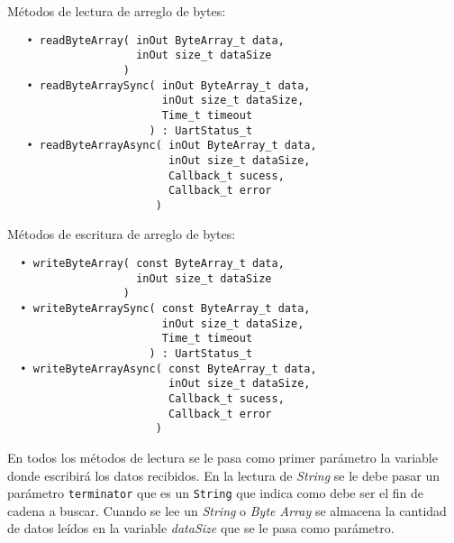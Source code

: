 \pagebreak  
Métodos de lectura de arreglo de bytes:

\begin{verbatim}
   • readByteArray( inOut ByteArray_t data,
                    inOut size_t dataSize
                  )
   • readByteArraySync( inOut ByteArray_t data,
                        inOut size_t dataSize,
                        Time_t timeout
                      ) : UartStatus_t
   • readByteArrayAsync( inOut ByteArray_t data, 
                         inOut size_t dataSize,
                         Callback_t sucess,
                         Callback_t error 
                       )
\end{verbatim}

Métodos de escritura de arreglo de bytes:

\begin{verbatim}
  • writeByteArray( const ByteArray_t data,
                    inOut size_t dataSize
                  )
  • writeByteArraySync( const ByteArray_t data,
                        inOut size_t dataSize,
                        Time_t timeout
                      ) : UartStatus_t
  • writeByteArrayAsync( const ByteArray_t data, 
                         inOut size_t dataSize,
                         Callback_t sucess,
                         Callback_t error
                       )
\end{verbatim}

En todos los métodos de lectura se le pasa como primer parámetro la variable donde escribirá los datos recibidos. En la lectura de \emph{String} se le debe pasar un parámetro \texttt{terminator} que es un \texttt{String} que indica como debe ser el fin de cadena a buscar. Cuando se lee un \emph{String} o \emph{Byte Array} se almacena la cantidad de datos leídos en la variable \emph{dataSize} que se le pasa como parámetro.

